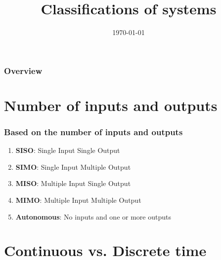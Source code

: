 \documentclass{beamer}
\title[Classifications of systems]{Classifications of systems} %
\author{} %
\institute[KU Leuven] %
{
Katholieke Universiteit Leuven \\ %
\medskip
\textit{} %
}
\date{\today} %
\begin{document}
\begin{frame}
\titlepage %
\end{frame}

\begin{frame}
\frametitle{Overview} %
\tableofcontents %
\end{frame}


\section{Number of inputs and outputs} 

\begin{frame}
\frametitle{Based on the number of inputs and outputs}
\vspace{-16ex}
\begin{enumerate}
\bigskip
\item \textbf{SISO}: Single Input Single Output
\medskip
\item \textbf{SIMO}: Single Input Multiple Output
\medskip
\item \textbf{MISO}: Multiple Input Single Output
\medskip
\item \textbf{MIMO}: Multiple Input Multiple Output
\medskip
\item \textbf{Autonomous}: No inputs and one or more outputs
\end{enumerate}
\end{frame}

\section{Continuous vs. Discrete time} 
\end{document}
